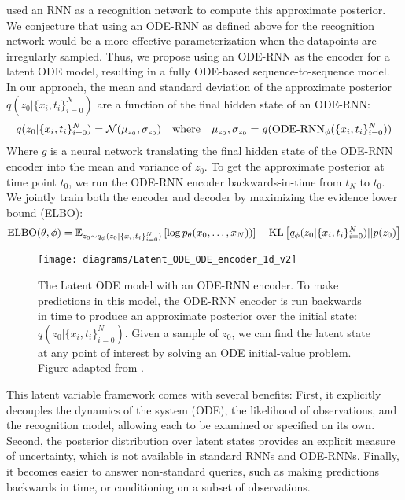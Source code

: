 \documentclass{article}
\begin{document}
\citet{NeuralODE} used an RNN as a recognition network to compute this approximate posterior.
We conjecture that using an ODE-RNN as defined above for the recognition network would be a more effective parameterization when the datapoints are irregularly sampled.
Thus, we propose using an ODE-RNN as the encoder for a latent ODE model, resulting in a fully ODE-based sequence-to-sequence model.
In our approach, the mean and standard deviation of the approximate posterior $q(z_0| \{x_i,t_i\}_{i=0}^N)$ are a function of the final hidden state of an ODE-RNN:
\begin{align}
q(z_0| \{x_i,t_i\}_{i=0}^N) = \mathcal{N} (\mu_{z_0}, \sigma_{z_0}) \quad \textnormal{where} \quad \mu_{z_0}, \sigma_{z_0} = g( \text{ODE-RNN}_{\phi}(\{x_i,t_i\}_{i=0}^N))
\end{align}
Where $g$ is a neural network translating the final hidden state of the ODE-RNN encoder into the mean and variance of $z_0$.
To get the approximate posterior at time point $t_0$, we run the ODE-RNN encoder backwards-in-time from $t_N$ to $t_0$.
We jointly train both the encoder and decoder by maximizing the evidence lower bound (ELBO):
\begin{align}
    \textnormal{ELBO}(\theta, \phi) = \mathbb{E}_{z_0 \sim q_\phi(z_0| \{x_i,t_i\}_{i=0}^N)} \left[ \log p_\theta(x_{0},\dots,x_{N})) \right] -\textnormal{KL}\left[q_\phi(z_0| \{x_i,t_i\}_{i=0}^N) || p(z_0) \right]
    \label{eq:elbo}
\end{align}
\begin{figure}
	\centering
	\texttt{[image: diagrams/Latent\_ODE\_ODE\_encoder\_1d\_v2]}
	\caption{The Latent ODE model with an ODE-RNN encoder.
	To make predictions in this model, the ODE-RNN encoder is run backwards in time to produce an approximate posterior over the initial state: $q(z_0| \{x_i,t_i\}_{i=0}^N)$.
	Given a sample of $z_0$, we can find the latent state at any point of interest by solving an ODE initial-value problem.
	Figure adapted from \citet{NeuralODE}.}
	\label{fig:latent-ode}
	\vspace{-3mm}
\end{figure}


This latent variable framework comes with several benefits:
First, it explicitly decouples the dynamics of the system (ODE), the likelihood of observations, and the recognition model, allowing each to be examined or specified on its own.
Second, the posterior distribution over latent states provides an explicit measure of uncertainty, which is not available in standard RNNs and ODE-RNNs.
Finally, it becomes easier to answer non-standard queries, such as making predictions backwards in time, or conditioning on a subset of observations.
\end{document}
